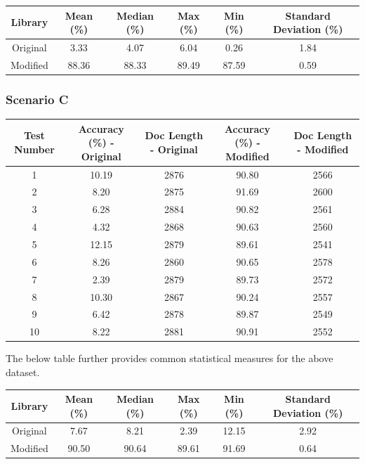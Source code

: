 \documentclass[9pt, titlepage]{article}
\begin{document}
  \begin{center}
    \begin{tabular}{||c c c c c c||} 
      \hline
      Library & Mean (\%) & Median (\%) & Max (\%) & Min (\%) & Standard Deviation (\%) \\ [0.5ex] 
      \hline\hline
      Original & 3.33 & 4.07 & 6.04 & 0.26 & 1.84 \\ 
      \hline
      Modified & 88.36 & 88.33 & 89.49 & 87.59 & 0.59 \\
      \hline
    \end{tabular}
  \end{center}
  \hfill

  \subsubsection{Scenario C}
  
  \begin{center}
    \begin{tabular}{||c c c c c||} 
      \hline
      Test Number & Accuracy (\%) - Original & Doc Length - Original & Accuracy (\%) - Modified & Doc Length - Modified \\ [0.5ex] 
      \hline\hline
      1 & 10.19 & 2876 & 90.80 & 2566 \\ 
      \hline
      2 &  8.20 & 2875 & 91.69 & 2600 \\ 
      \hline
      3 &  6.28 & 2884 & 90.82 & 2561 \\ 
      \hline
      4 &  4.32 & 2868 & 90.63 & 2560 \\ 
      \hline
      5 & 12.15 & 2879 & 89.61 & 2541 \\ 
      \hline
      6 &  8.26 & 2860 & 90.65 & 2578 \\ 
      \hline
      7 &  2.39 & 2879 & 89.73 & 2572 \\ 
      \hline
      8 & 10.30 & 2867 & 90.24 & 2557 \\ 
      \hline
      9 &  6.42 & 2878 & 89.87 & 2549 \\ 
      \hline
      10 & 8.22 & 2881 & 90.91 & 2552 \\ 
      \hline
    \end{tabular}
  \end{center}
  
  The below table further provides common statistical measures for the above dataset.\\

  \begin{center}
    \begin{tabular}{||c c c c c c||} 
      \hline
      Library & Mean (\%) & Median (\%) & Max (\%) & Min (\%) & Standard Deviation (\%) \\ [0.5ex] 
      \hline\hline
      Original & 7.67 & 8.21 & 2.39 & 12.15 & 2.92 \\ 
      \hline
      Modified & 90.50 & 90.64 & 89.61 & 91.69 & 0.64 \\
      \hline
    \end{tabular}
  \end{center}
  \hfill
\end{document}
